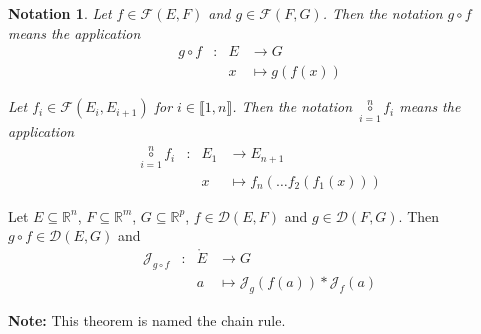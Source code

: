 \documentclass[11pt,en]{elegantpaper}
\newtheorem{notation}{Notation}
\newcommand{\Real}{\mathbb{R}}
\begin{document}
\begin{notation}
  Let $f \in \mathcal{F}(E,F)$ and $g \in \mathcal{F}(F,G)$.
  Then the notation $g \circ f$ means the application \begin{equation*}
    \begin{array}{llll}
      g \circ f & : & E & \longrightarrow G \\
        &   & x & \longmapsto g(f(x))
    \end{array}
  \end{equation*} \par

  Let $f_i \in \mathcal{F}(E_i,E_{i+1})$ for $i \in \llbracket 1,n \rrbracket$.
  Then the notation $\underset{i=1}{\overset{n}\circ} f_i$ means the application \begin{equation*}
    \begin{array}{llll}
      \underset{i=1}{\overset{n}\circ} f_i & : & E_1 & \longrightarrow E_{n+1} \\
        &   & x & \longmapsto f_n( \ldots f_2(f_1(x)))
    \end{array}
  \end{equation*}
\end{notation}

\begin{theorem}\label{theo:chain_rule}
  {\normalfont
    Let $E \subseteq \Real^n$, $F \subseteq \Real^m$, $G \subseteq \Real^p$, $f \in \mathcal{D}(E,F)$ and $g \in \mathcal{D}(F,G)$.
    Then $g \circ f \in \mathcal{D}(E,G)$ and \begin{equation}\label{theo:chain_rule_eq}
      \begin{array}{llll}
        \mathcal{J}_{g \circ f} & : & \mathring{E} & \longrightarrow G \\
        &   & a & \longmapsto \mathcal{J}_{g}(f(a)) * \mathcal{J}_{f}(a)
      \end{array}
    \end{equation} \par
    \textbf{Note:} This theorem is named the chain rule.
  }
\end{theorem}
\end{document}
